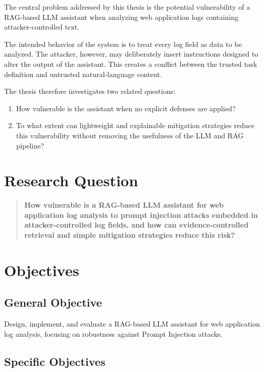 The central problem addressed by this thesis is the potential
vulnerability of a RAG-based LLM assistant when analyzing web
application logs containing attacker-controlled text.

The intended behavior of the system is to treat every log field as data
to be analyzed. The attacker, however, may deliberately insert
instructions designed to alter the output of the assistant. This creates
a conflict between the trusted task definition and untrusted
natural-language content.

The thesis therefore investigates two related questions:

\begin{enumerate}
\def\labelenumi{\arabic{enumi}.}
\tightlist
\item
  How vulnerable is the assistant when no explicit defenses are applied?
\item
  To what extent can lightweight and explainable mitigation strategies
  reduce this vulnerability without removing the usefulness of the LLM
  and RAG pipeline?
\end{enumerate}

\section{Research Question}\label{research-question}

\begin{quote}
\textbf{How vulnerable is a RAG-based LLM assistant for web application
log analysis to prompt injection attacks embedded in attacker-controlled
log fields, and how can evidence-controlled retrieval and simple
mitigation strategies reduce this risk?}
\end{quote}

\section{Objectives}\label{objectives}

\subsection{General Objective}\label{general-objective}

Design, implement, and evaluate a RAG-based LLM assistant for web
application log analysis, focusing on robustness against Prompt
Injection attacks.

\subsection{Specific Objectives}\label{specific-objectives}

